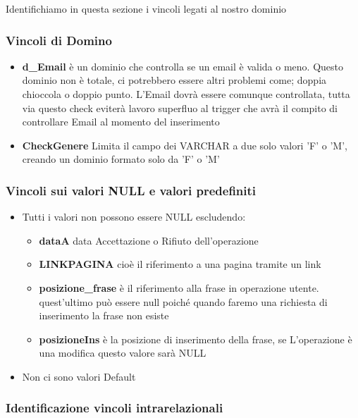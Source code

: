 Identifichiamo in questa sezione i vincoli legati al nostro dominio

\subsubsection{Vincoli di Domino}
\begin{itemize}

    \item {
        \textbf{d\_Email} è un dominio che controlla se un email è valida o  meno. Questo dominio non è totale, ci potrebbero essere altri problemi come; doppia chioccola o doppio punto. L'Email dovrà essere comunque controllata, tutta via questo check eviterà lavoro superfluo al trigger che avrà il compito di controllare Email al momento del inserimento\newline
        
    }
    \item {\textbf{CheckGenere} Limita il campo dei VARCHAR a due solo valori 'F' o 'M', creando un dominio formato solo da 'F' o 'M'}
    
    
\end{itemize}

\subsubsection{Vincoli sui valori NULL e valori predefiniti}
\begin{itemize}
    \item{Tutti i valori non possono essere NULL escludendo:
        \begin{itemize}
            \item{\textbf{dataA} data Accettazione o Rifiuto dell'operazione}
            \item{\textbf{LINKPAGINA} cioè il riferimento a una pagina tramite un link}
            \item{\textbf{posizione\_frase} è il riferimento alla frase in operazione utente. quest'ultimo può essere null poiché quando faremo una richiesta di inserimento la frase non esiste}
            \item{\textbf{posizioneIns} è la posizione di inserimento della frase, se L'operazione è una modifica questo valore sarà NULL}
        \end{itemize}
    }
    \item{Non ci sono valori Default}
\end{itemize}

\subsubsection{Identificazione vincoli intrarelazionali}

